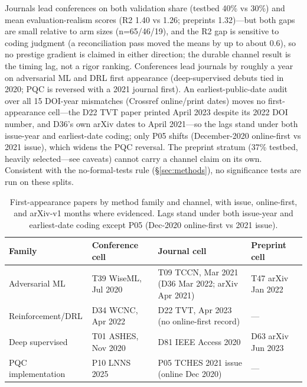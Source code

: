 \documentclass[11pt,a4paper]{article}
\begin{document}
Journals lead conferences on both validation share (testbed 40\% vs 30\%) and mean evaluation-realism scores (R2 1.40 vs 1.26; preprints 1.32)---but both gaps are small relative to arm sizes (n=65/46/19), and the R2 gap is sensitive to coding judgment (a reconciliation pass moved the means by up to about 0.6), so no prestige gradient is claimed in either direction; the durable channel result is the timing lag, not a rigor ranking. Conferences lead journals by roughly a year on adversarial ML and DRL first appearance (deep-supervised debuts tied in 2020; PQC is reversed with a 2021 journal first). An earliest-public-date audit over all 15 DOI-year mismatches (Crossref online/print dates) moves no first-appearance cell---the D22 TVT paper printed April 2023 despite its 2022 DOI number, and D36's own arXiv dates to April 2021---so the lags stand under both issue-year and earliest-date coding; only P05 shifts (December-2020 online-first vs 2021 issue), which widens the PQC reversal. The preprint stratum (37\% testbed, heavily selected---see caveats) cannot carry a channel claim on its own. Consistent with the no-formal-tests rule (\S\ref{sec:methods}), no significance tests are run on these splits.

\begin{table}[tbp]
\centering
\footnotesize
\caption{First-appearance papers by method family and channel, with issue, online-first, and arXiv-v1 months where evidenced. Lags stand under both issue-year and earliest-date coding except P05 (Dec-2020 online-first vs 2021 issue).}
\label{tab:firstappear}
\begin{tabular}{@{}l l p{4.6cm} l@{}}
\toprule
Family & Conference cell & Journal cell & Preprint cell \\
\midrule
Adversarial ML & T39 WiseML, Jul 2020 & T09 TCCN, Mar 2021 (D36 Mar 2022; arXiv Apr 2021) & T47 arXiv Jan 2022 \\
Reinforcement/DRL & D34 WCNC, Apr 2022 & D22 TVT, Apr 2023 (no online-first record) & --- \\
Deep supervised & T01 ASHES, Nov 2020 & D81 IEEE Access 2020 & D63 arXiv Jun 2023 \\
PQC implementation & P10 LNNS 2025 & P05 TCHES 2021 issue (online Dec 2020) & --- \\
\bottomrule
\end{tabular}
\end{table}
\end{document}
